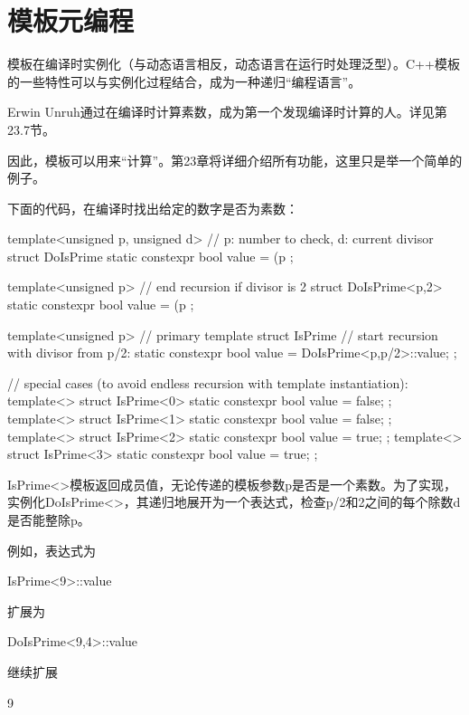 \section{模板元编程}
模板在编译时实例化（与动态语言相反，动态语言在运行时处理泛型）。C++模板的一些特性可以与实例化过程结合，成为一种递归“编程语言”。

\begin{notice}
Erwin Unruh通过在编译时计算素数，成为第一个发现编译时计算的人。详见第23.7节。
\end{notice}

因此，模板可以用来“计算”。第23章将详细介绍所有功能，这里只是举一个简单的例子。

下面的代码，在编译时找出给定的数字是否为素数：

\begin{cpp}
template<unsigned p, unsigned d> // p: number to check, d: current divisor
struct DoIsPrime {
	static constexpr bool value = (p%
};

template<unsigned p> // end recursion if divisor is 2
struct DoIsPrime<p,2> {
	static constexpr bool value = (p%
};

template<unsigned p> // primary template
struct IsPrime {
	// start recursion with divisor from p/2:
	static constexpr bool value = DoIsPrime<p,p/2>::value;
};

// special cases (to avoid endless recursion with template instantiation):
template<>
struct IsPrime<0> { static constexpr bool value = false; };
template<>
struct IsPrime<1> { static constexpr bool value = false; };
template<>
struct IsPrime<2> { static constexpr bool value = true; };
template<>
struct IsPrime<3> { static constexpr bool value = true; };
\end{cpp}

IsPrime<>模板返回成员值，无论传递的模板参数p是否是一个素数。为了实现，实例化DoIsPrime<>，其递归地展开为一个表达式，检查p/2和2之间的每个除数d是否能整除p。

例如，表达式为

\begin{cpp}
IsPrime<9>::value
\end{cpp}

扩展为

\begin{cpp}
DoIsPrime<9,4>::value
\end{cpp}

继续扩展

\begin{cpp}
9%
\end{cpp}

